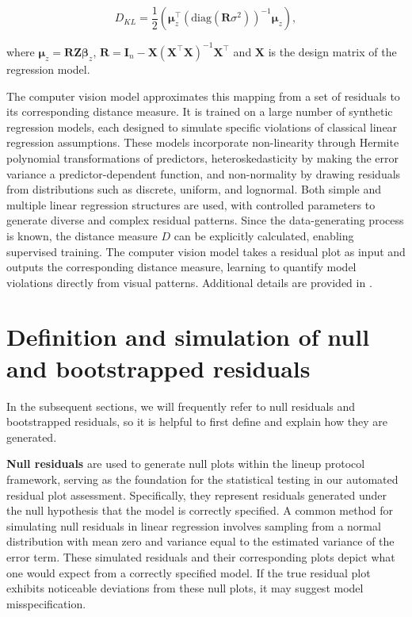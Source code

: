 \documentclass[
doublespace,
  times]{anzsauth}
\begin{document}
\begin{equation*} \label{eq:kl-2}
D_{KL} = \frac{1}{2}\left(\boldsymbol{\mu}_z^\top(\text{diag}(\boldsymbol{R}\sigma^2))^{-1}\boldsymbol{\mu}_z\right),
\end{equation*}

where
\(\boldsymbol{\mu}_z = \boldsymbol{R}\boldsymbol{Z}\boldsymbol{\beta}_z\),
\(\boldsymbol{R} = \boldsymbol{I}_n - \boldsymbol{X}(\boldsymbol{X}^\top\boldsymbol{X})^{-1}\boldsymbol{X}^\top\)
and \(\boldsymbol{X}\) is the design matrix of the regression model.

The computer vision model approximates this mapping from a set of
residuals to its corresponding distance measure. It is trained on a
large number of synthetic regression models, each designed to simulate
specific violations of classical linear regression assumptions. These
models incorporate non-linearity through Hermite polynomial
transformations of predictors, heteroskedasticity by making the error
variance a predictor-dependent function, and non-normality by drawing
residuals from distributions such as discrete, uniform, and lognormal.
Both simple and multiple linear regression structures are used, with
controlled parameters to generate diverse and complex residual patterns.
Since the data-generating process is known, the distance measure \(D\)
can be explicitly calculated, enabling supervised training. The computer
vision model takes a residual plot as input and outputs the
corresponding distance measure, learning to quantify model violations
directly from visual patterns. Additional details are provided in
\citet{li2024automated}.

\section{Definition and simulation of null and bootstrapped
residuals}\label{sec-null-and-boot-desc}

In the subsequent sections, we will frequently refer to null residuals
and bootstrapped residuals, so it is helpful to first define and explain
how they are generated.

\textbf{Null residuals} are used to generate null plots within the
lineup protocol framework, serving as the foundation for the statistical
testing in our automated residual plot assessment. Specifically, they
represent residuals generated under the null hypothesis that the model
is correctly specified. A common method for simulating null residuals in
linear regression involves sampling from a normal distribution with mean
zero and variance equal to the estimated variance of the error term.
These simulated residuals and their corresponding plots depict what one
would expect from a correctly specified model. If the true residual plot
exhibits noticeable deviations from these null plots, it may suggest
model misspecification.
\end{document}
